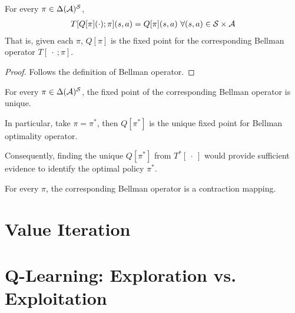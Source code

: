 \documentclass{article}
\begin{document}
	\begin{proposition}
		For every $\pi \in \Delta(\mathcal{{A}})^{\mathcal{{S}}}$,
		\begin{align}
			T[Q[\pi](\cdot); \pi](s, a) = Q[\pi](s, a)\ \forall (s, a) \in \mathcal{{S}} \times \mathcal{{A}}
		\end{align}
		That is, given each $\pi$, $Q[\pi]$ is the fixed point for the corresponding Bellman operator $T[\ \cdot\ ; \pi]$.
	\end{proposition}
	
	\begin{proof}
		Follows the definition of Bellman operator.
	\end{proof}
	
	\begin{theorem}
		For every $\pi \in \Delta(\mathcal{{A}})^{\mathcal{{S}}}$, the fixed point of the corresponding Bellman operator is unique.
	\end{theorem}
	
	\begin{corollary}
		In particular, take $\pi = \pi^*$, then $Q[\pi^*]$ is the unique fixed point for Bellman optimality operator.
	\end{corollary}
	
	\par Consequently, finding the unique $Q[\pi^*]$ from $T^*[\ \cdot\ ]$ would provide sufficient evidence to identify the optimal policy $\pi^*$.
	
	\begin{theorem}
		For every $\pi$, the corresponding Bellman operator is a contraction mapping.
	\end{theorem}
	
	\section{Value Iteration}
	
	\section{Q-Learning: Exploration vs. Exploitation}
\end{document}

